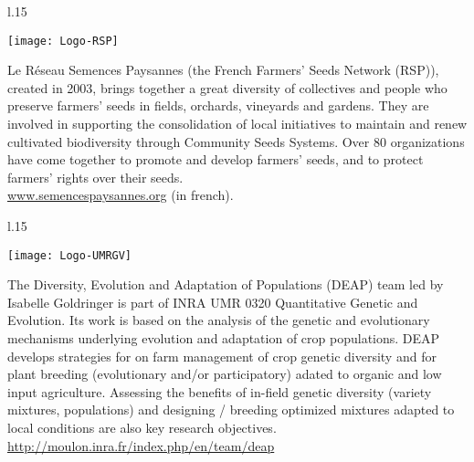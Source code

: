 \vfill

\begin{wrapfigure}{l}{.15\textwidth}
\begin{center} \vspace{-20pt}
\texttt{[image: Logo-RSP]}
\end{center} \vspace{-20pt}
\end{wrapfigure}
\noindent
Le Réseau Semences Paysannes (the French Farmers' Seeds Network (RSP)), created in 2003, brings together a great diversity of collectives and people who preserve farmers' seeds in fields, orchards, vineyards and gardens. They are involved in supporting the consolidation of local initiatives to maintain and renew cultivated biodiversity through Community Seeds Systems. Over 80 organizations have come together to promote and develop farmers' seeds, and to protect farmers' rights over their seeds. \\
\url{www.semencespaysannes.org} (in french).


\vfill

\begin{wrapfigure}{l}{.15\textwidth}
\begin{center} \vspace{-20pt}
\texttt{[image: Logo-UMRGV]}
\end{center} \vspace{-20pt}
\end{wrapfigure}
\noindent
The Diversity, Evolution and Adaptation of Populations (DEAP) team led by Isabelle Goldringer is part of INRA UMR 0320 Quantitative Genetic and Evolution.
Its work is based on the analysis of the genetic and evolutionary mechanisms underlying evolution and adaptation of crop populations.
DEAP develops strategies for on farm management of crop genetic diversity and
for plant breeding (evolutionary and/or participatory) adated to organic and low input agriculture.
Assessing the benefits of in-field genetic diversity (variety mixtures, populations) and designing
/ breeding optimized mixtures adapted to local conditions are also key research objectives.\\
\url{http://moulon.inra.fr/index.php/en/team/deap}


\vfill


